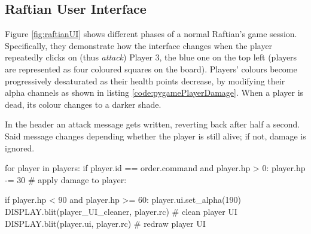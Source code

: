 \subsection{Raftian User Interface}

Figure \ref{fig:raftianUI} shows different phases of a normal Raftian's game session. Specifically, they demonstrate how the interface changes when the player repeatedly clicks on (thus \textit{attack}) Player 3, the blue one on the top left (players are represented as four coloured squares on the board). Players' colours become progressively desaturated as their health points decrease, by modifying their alpha channels as shown in listing \ref{code:pygamePlayerDamage}. When a player is dead, its colour changes to a darker shade. 

In the header an attack message gets written, reverting back after half a second. Said message changes depending whether the player is still alive; if not, damage is ignored. 

\begin{python}[label={code:pygamePlayerDamage}, caption={Whenever a player gets damaged, its colour gets desaturated}]
for player in players:
    if player.id == order.command and player.hp > 0:
        player.hp -= 30  # apply damage to player:

        if player.hp < 90 and player.hp >= 60:
            player.ui.set_alpha(190)
            DISPLAY.blit(player_UI_cleaner, player.rc)  # clean player UI
            DISPLAY.blit(player.ui, player.rc)          # redraw player UI
\end{python}

